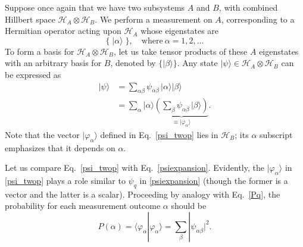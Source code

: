 \documentclass[pra,12pt]{revtex4-2}
\begin{document}
Suppose once again that we have two subsystems $A$ and $B$, with
combined Hillbert space $\mathscr{H}_A \otimes \mathscr{H}_B$.  We
perform a measurement on $A$, corresponding to a Hermitian operator
acting upon $\mathscr{H}_A$ whose eigenstates are
\begin{equation*}
  \big\{\;|\alpha\rangle\; \big\}, \quad
  \mathrm{where}~\alpha = 1, 2, \dots
\end{equation*}
To form a basis for $\mathscr{H}_A \otimes \mathscr{H}_B$, let us take
tensor products of these $A$ eigenstates with an arbitrary basis for
$B$, denoted by $\{|\beta\rangle\}$.  Any state $|\psi\rangle \in
\mathscr{H}_A \otimes \mathscr{H}_B$ can be expressed as
\begin{align}
  |\psi\rangle &= \sum_{\alpha\beta}
  \psi_{\alpha\beta}\, |\alpha\rangle |\beta\rangle \\
  &= \sum_\alpha |\alpha\rangle \underbrace{\left( \sum_\beta \psi_{\alpha\beta}\,|\beta\rangle\right)}_{\displaystyle \equiv |\varphi_\alpha\rangle}.
  \label{psi_twop}
\end{align}
Note that the vector $|\varphi_\alpha\rangle$ defined in
Eq.~\eqref{psi_twop} lies in $\mathscr{H}_B$; its $\alpha$ subscript
emphasizes that it depends on $\alpha$.

Let us compare Eq.~\eqref{psi_twop} with Eq.~\eqref{psiexpansion}.
Evidently, the $|\varphi_\alpha\rangle$ in \eqref{psi_twop} plays a
role similar to $\psi_q$ in \eqref{psiexpansion} (though the former is
a vector and the latter is a scalar).  Proceeding by analogy with
Eq.~\eqref{Pq}, the probability for each measurement outcome $\alpha$
should be
\begin{equation}
  P(\alpha) = \langle\varphi_\alpha|\varphi_\alpha\rangle
  = \sum_\beta |\psi_{\alpha\beta}|^2.
  \label{Palpha0}
\end{equation}
\end{document}
